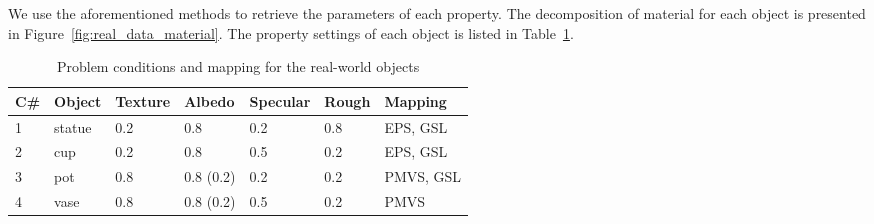 We use the aforementioned methods to retrieve the parameters of each property. The decomposition of material for each object is presented in Figure~\ref{fig:real_data_material}. The property settings of each object is listed in Table~\ref{tab:real_data_prop_list}.
\begin{table}[!htbp]
  \centering
  \begin{tabular}{lllllll}
  \toprule
  C\# & Object & Texture & Albedo & Specular & Rough & Mapping\\
  \midrule
  1 & statue & 0.2 & 0.8 & 0.2 & 0.8 & EPS, GSL\\
  2 & cup & 0.2 & 0.8 & 0.5 & 0.2 & EPS, GSL\\
  3 & pot & 0.8 & 0.8 (0.2) & 0.2 & 0.2 & PMVS, GSL\\
  4 & vase & 0.8 & 0.8 (0.2) & 0.5 & 0.2 & PMVS\\
  \bottomrule
  \end{tabular}
  \caption{Problem conditions and mapping for the real-world objects}
  \label{tab:real_data_prop_list}
\end{table}


